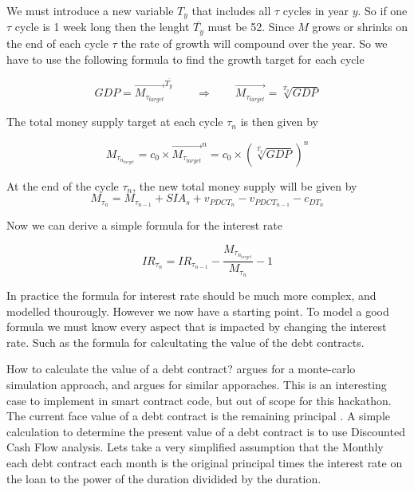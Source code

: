 We must introduce a new variable $T_{y}$ that includes all $\tau$ cycles in year $y$. So if one $\tau$ cycle is 1 week long then the lenght $\overline{T_{y}}$ must be 52. Since $M$ grows or shrinks on the end of each cycle $\tau$ the rate of growth will compound over the year. So we have to use the following formula to find the growth target for each cycle

\begin{equation}
    GDP = \overrightarrow{M_{\tau_{target}}}^{\overline{T_{y}}} \qquad \Rightarrow \qquad \overrightarrow{M_{\tau_{target}}} = \sqrt[\overline{T_{y}}]{GDP}
\end{equation}

The total money supply target at each cycle $\tau_{n}$ is then given by

\begin{equation}
    M_{\tau_{n_{target}}} = c_{0} \times \overrightarrow{M_{\tau_{target}}}^{n} = c_{0} \times (\sqrt[\overline{T_{y}}]{GDP})^n 
\end{equation}

At the end of the cycle $\tau_{n}$, the new total money supply will be given by
\begin{equation}
    M_{\tau_{n}} = M_{\tau_{n-1}} + SIA_{s} + v_{PDCT_{n}} - v_{PDCT_{n-1}} - c_{DT_{n}}
\end{equation}

Now we can derive a simple formula for the interest rate

\begin{equation}
    IR_{\tau_{n}} = IR_{\tau_{n-1}} - \frac{M_{\tau_{n_{target}}}}{M_{\tau_{n}}} - 1
\end{equation}

In practice the formula for interest rate should be much more complex, and modelled thourougly. However we now have a starting point. To model a good formula we must know every aspect that is impacted by changing the interest rate. Such as the formula for calcultating the value of the debt contracts.


How to calculate the value of a debt contract? \textcite{fabozzi2008introduction} argues for a monte-carlo simulation approach, and \textcite{tang2015valuation} argues for similar apporaches. This is an interesting case to implement in smart contract code, but out of scope for this hackathon. The current face value of a debt contract is the remaining principal \cite{FaceValueMBS}. A simple calculation to determine the present value of a debt contract is to use Discounted Cash Flow analysis. Lets take a very simplified assumption that the Monthly each debt contract each month is the original principal times the interest rate on the loan to the power of the duration dividided by the duration. 

